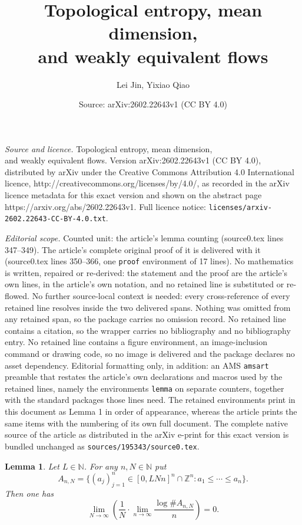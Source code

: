 \documentclass[10pt,a4paper]{amsart}
\title{Topological entropy, mean dimension,\\and weakly equivalent flows}
\author{Lei Jin, Yixiao Qiao}
\date{Source: arXiv:2602.22643v1 (CC BY 4.0)}
\newtheorem{lemma}{Lemma}
\begin{document}
\maketitle

\noindent\emph{Source and licence.} Topological entropy, mean dimension,\\and weakly equivalent flows. Version arXiv:2602.22643v1 (CC BY 4.0), distributed by arXiv under the Creative Commons Attribution 4.0 International licence, http://creativecommons.org/licenses/by/4.0/, as recorded in the arXiv licence metadata for this exact version and shown on the abstract page https://arxiv.org/abs/2602.22643v1. Full licence notice: \texttt{licenses/arxiv-2602.22643-CC-BY-4.0.txt}.\par\smallskip

\noindent\textit{Editorial scope.} Counted unit: the article's lemma counting (source0.tex lines 347--349). The article's complete original proof of it is delivered with it (source0.tex lines 350--366, one \texttt{proof} environment of 17 lines). No mathematics is written, repaired or re-derived: the statement and the proof are the article's own lines, in the article's own notation, and no retained line is substituted or re-flowed.  No further source-local context is needed: every cross-reference of every retained line resolves inside the two delivered spans.  Nothing was omitted from any retained span, so the package carries no omission record.  No retained line contains a citation, so the wrapper carries no bibliography and no bibliography entry.  No retained line contains a figure environment, an image-inclusion command or drawing code, so no image is delivered and the package declares no asset dependency.  Editorial formatting only, in addition: an AMS \texttt{amsart} preamble that restates the article's own declarations and macros used by the retained lines, namely the environments \texttt{lemma} on separate counters, together with the standard packages those lines need.  The retained environments print in this document as Lemma 1 in order of appearance, whereas the article prints the same items with the numbering of its own full document.  The complete native source of the article as distributed in the arXiv e-print for this exact version is bundled unchanged as \texttt{sources/195343/source0.tex}.
\begin{lemma}\label{counting}
Let $L\in\mathbb{N}$. For any $n,N\in\mathbb{N}$ put $$A_{n,N}=\{(a_j)_{j=1}^n\in[0,LNn]^n\cap\mathbb{Z}^n:a_1\le\cdots\le a_n\}.$$ Then one has $$\lim_{N\to\infty}\left(\frac1N\cdot\lim_{n\to\infty}\frac{\log\#A_{n,N}}{n}\right)=0.$$
\end{lemma}
\end{document}
